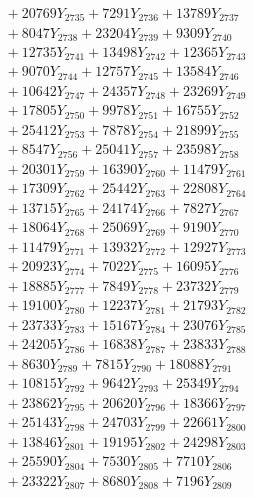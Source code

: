 \documentclass[a4paper,10pt]{article}
\begin{document}
{\begin{align}
&\;  + 20769 Y_{2735} + 7291 Y_{2736} + 13789 Y_{2737} \\[0.3ex]
&\;  + 8047 Y_{2738} + 23204 Y_{2739} + 9309 Y_{2740} \\[0.3ex]
&\;  + 12735 Y_{2741} + 13498 Y_{2742} + 12365 Y_{2743} \\[0.3ex]
&\;  + 9070 Y_{2744} + 12757 Y_{2745} + 13584 Y_{2746} \\[0.3ex]
&\;  + 10642 Y_{2747} + 24357 Y_{2748} + 23269 Y_{2749} \\[0.3ex]
&\;  + 17805 Y_{2750} + 9978 Y_{2751} + 16755 Y_{2752} \\[0.3ex]
&\;  + 25412 Y_{2753} + 7878 Y_{2754} + 21899 Y_{2755} \\[0.3ex]
&\;  + 8547 Y_{2756} + 25041 Y_{2757} + 23598 Y_{2758} \\[0.5ex]\allowbreak
&\;  + 20301 Y_{2759} + 16390 Y_{2760} + 11479 Y_{2761} \\[0.3ex]
&\;  + 17309 Y_{2762} + 25442 Y_{2763} + 22808 Y_{2764} \\[0.3ex]
&\;  + 13715 Y_{2765} + 24174 Y_{2766} + 7827 Y_{2767} \\[0.3ex]
&\;  + 18064 Y_{2768} + 25069 Y_{2769} + 9190 Y_{2770} \\[0.3ex]
&\;  + 11479 Y_{2771} + 13932 Y_{2772} + 12927 Y_{2773} \\[0.3ex]
&\;  + 20923 Y_{2774} + 7022 Y_{2775} + 16095 Y_{2776} \\[0.3ex]
&\;  + 18885 Y_{2777} + 7849 Y_{2778} + 23732 Y_{2779} \\[0.3ex]
&\;  + 19100 Y_{2780} + 12237 Y_{2781} + 21793 Y_{2782} \\[0.3ex]
&\;  + 23733 Y_{2783} + 15167 Y_{2784} + 23076 Y_{2785} \\[0.3ex]
&\;  + 24205 Y_{2786} + 16838 Y_{2787} + 23833 Y_{2788} \\[0.5ex]\allowbreak
&\;  + 8630 Y_{2789} + 7815 Y_{2790} + 18088 Y_{2791} \\[0.3ex]
&\;  + 10815 Y_{2792} + 9642 Y_{2793} + 25349 Y_{2794} \\[0.3ex]
&\;  + 23862 Y_{2795} + 20620 Y_{2796} + 18366 Y_{2797} \\[0.3ex]
&\;  + 25143 Y_{2798} + 24703 Y_{2799} + 22661 Y_{2800} \\[0.3ex]
&\;  + 13846 Y_{2801} + 19195 Y_{2802} + 24298 Y_{2803} \\[0.3ex]
&\;  + 25590 Y_{2804} + 7530 Y_{2805} + 7710 Y_{2806} \\[0.3ex]
&\;  + 23322 Y_{2807} + 8680 Y_{2808} + 7196 Y_{2809} \\[0.3ex]

\end{align}}
\end{document}
